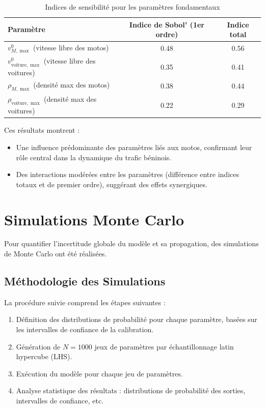\begin{table}[htbp]
\centering
\caption{Indices de sensibilité pour les paramètres fondamentaux}
\label{tab:indices_sensibilite}
\begin{tabular}{lcc}
\toprule
\textbf{Paramètre} & \textbf{Indice de Sobol' (1er ordre)} & \textbf{Indice total} \\
\midrule
$v_{M,\max}^0$ (vitesse libre des motos) & 0.48 & 0.56 \\
$v_{\text{voiture},\max}^0$ (vitesse libre des voitures) & 0.35 & 0.41 \\
$\rho_{M,\max}$ (densité max des motos) & 0.38 & 0.44 \\
$\rho_{\text{voiture},\max}$ (densité max des voitures) & 0.22 & 0.29 \\
\bottomrule
\end{tabular}
\end{table}

Ces résultats montrent :
\begin{itemize}
\item Une influence prédominante des paramètres liés aux motos, confirmant leur rôle central dans la dynamique du trafic béninois.
\item Des interactions modérées entre les paramètres (différence entre indices totaux et de premier ordre), suggérant des effets synergiques.
\end{itemize}

\section{Simulations Monte Carlo}
\label{sec:monte_carlo}

Pour quantifier l'incertitude globale du modèle et sa propagation, des simulations de Monte Carlo ont été réalisées.

\subsection{Méthodologie des Simulations}
\label{subsec:methodologie_monte_carlo}

La procédure suivie comprend les étapes suivantes :

\begin{enumerate}
\item Définition des distributions de probabilité pour chaque paramètre, basées sur les intervalles de confiance de la calibration.
\item Génération de $N=1000$ jeux de paramètres par échantillonnage latin hypercube (LHS).
\item Exécution du modèle pour chaque jeu de paramètres.
\item Analyse statistique des résultats : distributions de probabilité des sorties, intervalles de confiance, etc.
\end{enumerate}

